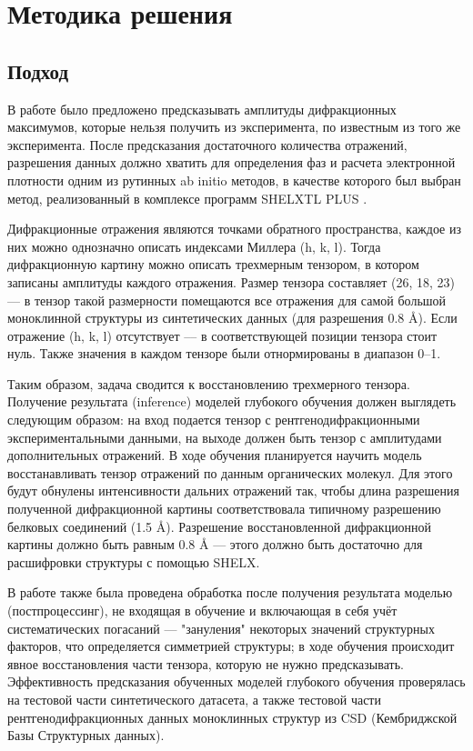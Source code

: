 \section{Методика решения}

\subsection{Подход}

В работе было предложено предсказывать амплитуды дифракционных максимумов, которые нельзя получить из эксперимента, по известным из того же эксперимента. После предсказания достаточного количества отражений, разрешения данных должно хватить для определения фаз и расчета электронной плотности одним из рутинных ab initio методов, в качестве которого был выбран метод, реализованный в комплексе программ SHELXTL PLUS \cite{sheldrick_shelxt_2015}.

Дифракционные отражения являются точками обратного пространства, каждое из них можно однозначно описать индексами Миллера (h, k, l). Тогда дифракционную картину можно описать трехмерным тензором, в котором записаны амплитуды каждого отражения. Размер тензора составляет (26, 18, 23) --- в тензор такой размерности помещаются все отражения для самой большой моноклинной структуры из синтетических данных (для разрешения 0.8 \r{A}). Если отражение (h, k, l) отсутствует --– в соответствующей позиции тензора стоит нуль. Также значения в каждом тензоре были отнормированы в диапазон 0--1.

Таким образом, задача сводится к восстановлению трехмерного тензора. Получение результата (inference) моделей глубокого обучения должен выглядеть следующим образом: на вход подается тензор с рентгенодифракционными экспериментальными данными, на выходе должен быть тензор с амплитудами дополнительных отражений. В ходе обучения планируется научить модель восстанавливать тензор отражений по данным органических молекул. Для этого будут обнулены интенсивности дальних отражений так, чтобы длина разрешения полученной дифракционной картины соответствовала типичному разрешению белковых соединений (1.5 \r{A}). Разрешение восстановленной дифракционной картины должно быть равным 0.8 \r{A} --- этого должно быть достаточно для расшифровки структуры с помощью SHELX.

В работе также была проведена обработка после получения результата моделью (постпроцессинг), не входящая в обучение и включающая в себя учёт систематических погасаний --- "зануления" некоторых значений структурных факторов, что определяется симметрией структуры; в ходе обучения происходит явное восстановления части тензора, которую не нужно предсказывать.
Эффективность предсказания обученных моделей глубокого обучения проверялась на тестовой части синтетического датасета, а также тестовой части рентгенодифракционных данных моноклинных структур из CSD (Кембриджской Базы Структурных данных).

